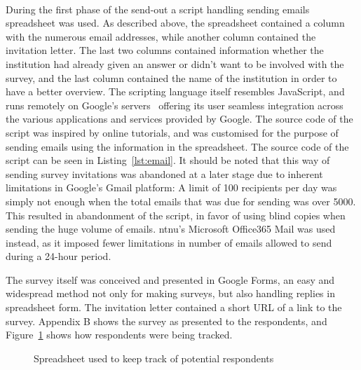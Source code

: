 \newline
\\
During the first phase of the send-out a script handling sending emails spreadsheet was used. As described above, the spreadsheet contained a column with the numerous email addresses, while another column contained the invitation letter. The last two columns contained information whether the institution had already given an answer or didn't want to be involved with the survey, and the last column contained the name of the institution in order to have a better overview. The scripting language itself resembles JavaScript, and runs remotely on Google's servers~\cite{google2016} offering its user seamless integration across the various applications and services provided by Google. The source code of the script was inspired by online tutorials, and was customised for the purpose of sending emails using the information in the spreadsheet. The source code of the script can be seen in Listing~\ref{lst:email}. It should be noted that this way of sending survey invitations was abandoned at a later stage due to inherent limitations in Google's Gmail platform: A limit of 100 recipients per day was simply not enough when the total emails that was due for sending was over 5000. This resulted in abandonment of the script, in favor of using blind copies when sending the huge volume of emails. \gls{ntnu}'s Microsoft Office365 Mail was used instead, as it imposed fewer limitations in number of emails allowed to send during a 24-hour period.


The survey itself was conceived and presented in Google Forms, an easy and widespread method not only for making surveys, but also handling replies in spreadsheet form. The invitation letter contained a short URL of a link to the survey. Appendix B shows the survey as presented to the respondents, and Figure~\ref{fig:contactsheet} shows how respondents were being tracked.


\begin{figure}
    \centering
    \caption{Spreadsheet used to keep track of potential respondents}
    \label{fig:contactsheet}
\end{figure}


